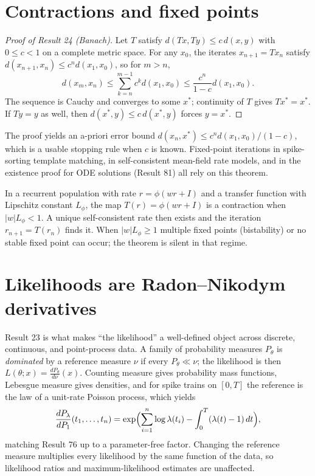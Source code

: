 \section{Contractions and fixed points}
\begin{proof}[Proof of Result 24 (Banach)]
Let $T$ satisfy $d(Tx,Ty)\le c\,d(x,y)$ with $0\le c<1$ on a
complete metric space. For any $x_0$, the iterates $x_{n+1}=Tx_n$
satisfy $d(x_{n+1},x_n)\le c^nd(x_1,x_0)$, so for $m>n$,
\[
d(x_m,x_n)\le\sum_{k=n}^{m-1}c^kd(x_1,x_0)\le\frac{c^n}{1-c}d(x_1,x_0).
\]
The sequence is Cauchy and converges to some $x^\ast$; continuity
of $T$ gives $Tx^\ast=x^\ast$. If $Ty=y$ as well, then
$d(x^\ast,y)\le c\,d(x^\ast,y)$ forces $y=x^\ast$.
\end{proof}
The proof yields an a-priori error bound $d(x_n,x^\ast)\le c^n d(x_1,x_0)/(1-c)$,
which is a usable stopping rule when $c$ is known. Fixed-point iterations
in spike-sorting template matching, in self-consistent mean-field rate
models, and in the existence proof for ODE solutions (Result 81) all
rely on this theorem.

\begin{example}
In a recurrent population with rate $r=\phi(wr+I)$ and a transfer
function with Lipschitz constant $L_\phi$, the map
$T(r)=\phi(wr+I)$ is a contraction when $|w|L_\phi<1$. A unique
self-consistent rate then exists and the iteration $r_{n+1}=T(r_n)$
finds it. When $|w|L_\phi\ge1$ multiple fixed points (bistability)
or no stable fixed point can occur; the theorem is silent in that regime.
\end{example}

\section{Likelihoods are Radon--Nikodym derivatives}
Result 23 is what makes ``the likelihood'' a well-defined object across
discrete, continuous, and point-process data. A family of probability
measures $P_\theta$ is \emph{dominated} by a reference measure $\nu$ if
every $P_\theta\ll\nu$; the likelihood is then $L(\theta;x)=\frac{dP_\theta}{d\nu}(x)$.
Counting measure gives probability mass functions, Lebesgue measure
gives densities, and for spike trains on $[0,T]$ the reference is the
law of a unit-rate Poisson process, which yields
\[
\frac{dP_\lambda}{dP_1}(t_1,\ldots,t_n)
=\exp\Bigl(\sum_{i=1}^n\log\lambda(t_i)-\int_0^T(\lambda(t)-1)\,dt\Bigr),
\]
matching Result 76 up to a parameter-free factor. Changing the reference
measure multiplies every likelihood by the same function of the data,
so likelihood ratios and maximum-likelihood estimates are unaffected.

